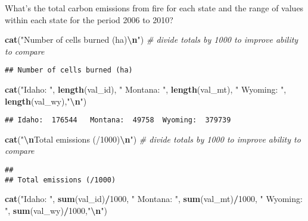 \documentclass[
]{article}
\newenvironment{Shaded}{\begin{snugshade}}{\end{snugshade}}
\newcommand{\CommentTok}[1]{\textcolor[rgb]{0.56,0.35,0.01}{\textit{#1}}}
\newcommand{\DecValTok}[1]{\textcolor[rgb]{0.00,0.00,0.81}{#1}}
\newcommand{\FunctionTok}[1]{\textcolor[rgb]{0.13,0.29,0.53}{\textbf{#1}}}
\newcommand{\NormalTok}[1]{#1}
\newcommand{\SpecialCharTok}[1]{\textcolor[rgb]{0.81,0.36,0.00}{\textbf{#1}}}
\newcommand{\StringTok}[1]{\textcolor[rgb]{0.31,0.60,0.02}{#1}}
\begin{document}
What's the total carbon emissions from fire for each state and the range
of values within each state for the period 2006 to 2010?

\begin{Shaded}
\begin{Highlighting}[]
\FunctionTok{cat}\NormalTok{(}\StringTok{"Number of cells burned (ha)}\SpecialCharTok{\textbackslash{}n}\StringTok{"}\NormalTok{)  }\CommentTok{\# divide totals by 1000 to improve ability to compare}
\end{Highlighting}
\end{Shaded}

\begin{verbatim}
## Number of cells burned (ha)
\end{verbatim}

\begin{Shaded}
\begin{Highlighting}[]
\FunctionTok{cat}\NormalTok{(}\StringTok{"Idaho: "}\NormalTok{, }\FunctionTok{length}\NormalTok{(val\_id), }\StringTok{"  Montana: "}\NormalTok{, }\FunctionTok{length}\NormalTok{(val\_mt), }
        \StringTok{" Wyoming: "}\NormalTok{, }\FunctionTok{length}\NormalTok{(val\_wy),}\StringTok{"}\SpecialCharTok{\textbackslash{}n}\StringTok{"}\NormalTok{)}
\end{Highlighting}
\end{Shaded}

\begin{verbatim}
## Idaho:  176544   Montana:  49758  Wyoming:  379739
\end{verbatim}

\begin{Shaded}
\begin{Highlighting}[]
\FunctionTok{cat}\NormalTok{(}\StringTok{"}\SpecialCharTok{\textbackslash{}n}\StringTok{Total emissions (/1000)}\SpecialCharTok{\textbackslash{}n}\StringTok{"}\NormalTok{)  }\CommentTok{\# divide totals by 1000 to improve ability to compare}
\end{Highlighting}
\end{Shaded}

\begin{verbatim}
## 
## Total emissions (/1000)
\end{verbatim}

\begin{Shaded}
\begin{Highlighting}[]
\FunctionTok{cat}\NormalTok{(}\StringTok{"Idaho: "}\NormalTok{, }\FunctionTok{sum}\NormalTok{(val\_id)}\SpecialCharTok{/}\DecValTok{1000}\NormalTok{, }\StringTok{"  Montana: "}\NormalTok{, }\FunctionTok{sum}\NormalTok{(val\_mt)}\SpecialCharTok{/}\DecValTok{1000}\NormalTok{, }
        \StringTok{" Wyoming: "}\NormalTok{, }\FunctionTok{sum}\NormalTok{(val\_wy)}\SpecialCharTok{/}\DecValTok{1000}\NormalTok{,}\StringTok{"}\SpecialCharTok{\textbackslash{}n}\StringTok{"}\NormalTok{)   }
\end{Highlighting}
\end{Shaded}
\end{document}

